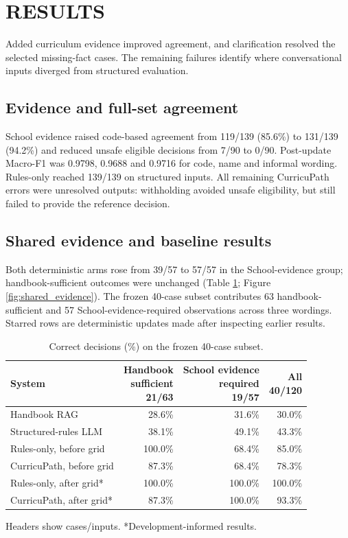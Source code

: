 \section{RESULTS}
Added curriculum evidence improved agreement, and clarification resolved the selected missing-fact cases. The remaining failures identify where conversational inputs diverged from structured evaluation.

\subsection{Evidence and full-set agreement}
School evidence raised code-based agreement from 119/139 (85.6\%) to 131/139 (94.2\%) and reduced unsafe eligible decisions from 7/90 to 0/90. Post-update Macro-F1 was 0.9798, 0.9688 and 0.9716 for code, name and informal wording. Rules-only reached 139/139 on structured inputs. All remaining CurricuPath errors were unresolved outputs: withholding avoided unsafe eligibility, but still failed to provide the reference decision.

\subsection{Shared evidence and baseline results}
Both deterministic arms rose from 39/57 to 57/57 in the School-evidence group; handbook-sufficient outcomes were unchanged (Table \ref{tab:shared_evidence}; Figure \ref{fig:shared_evidence}). The frozen 40-case subset contributes 63 handbook-sufficient and 57 School-evidence-required observations across three wordings. Starred rows are deterministic updates made after inspecting earlier results.

\begin{table}[tb]
\caption{Correct decisions (\%) on the frozen 40-case subset.}
\label{tab:shared_evidence}
\centering
\small
\setlength{\tabcolsep}{3pt}
\begin{tabular}{p{29mm}rrr}
\hline
System & \shortstack{Handbook\\sufficient\\21/63} & \shortstack{School evidence\\required\\19/57} & \shortstack{All\\40/120}\\
\hline
Handbook RAG & 28.6\% & 31.6\% & 30.0\%\\
Structured-rules LLM & 38.1\% & 49.1\% & 43.3\%\\
Rules-only, before grid & 100.0\% & 68.4\% & 85.0\%\\
CurricuPath, before grid & 87.3\% & 68.4\% & 78.3\%\\
Rules-only, after grid* & 100.0\% & 100.0\% & 100.0\%\\
CurricuPath, after grid* & 87.3\% & 100.0\% & 93.3\%\\
\hline
\end{tabular}
\par\smallskip\noindent Headers show cases/inputs. *Development-informed results.
\end{table}

